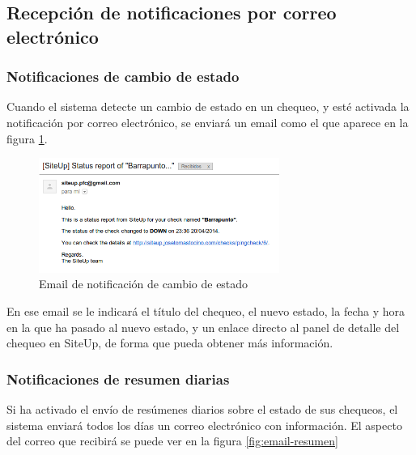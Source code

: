 \subsection{Recepción de notificaciones por correo electrónico}

\subsubsection{Notificaciones de cambio de estado}

Cuando el sistema detecte un cambio de estado en un chequeo, y esté activada la
notificación por correo electrónico, se enviará un email como el que aparece en
la figura \ref{fig:email-estado}.

\begin{figure}[hbtp]
  \centering
  \includegraphics[width=0.7\textwidth]{apendice_manual_usuario/email_estado.png}
  \caption{Email de notificación de cambio de estado}
  \label{fig:email-estado}
\end{figure}

En ese email se le indicará el título del chequeo, el nuevo estado, la fecha y
hora en la que ha pasado al nuevo estado, y un enlace directo al panel de
detalle del chequeo en SiteUp, de forma que pueda obtener más información.

\subsubsection{Notificaciones de resumen diarias}

Si ha activado el envío de resúmenes diarios sobre el estado de sus chequeos, el
sistema enviará todos los días un correo electrónico con información. El aspecto
del correo que recibirá se puede ver en la figura \ref{fig:email-resumen}

